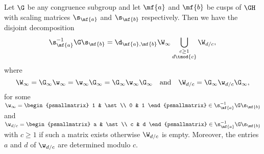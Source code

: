       \begin{theorem}
        Let $\G$ be any congruence subgroup and let $\mf{a}$ and $\mf{b}$ be cusps of $\GH$ with scaling matrices $\s_{\mf{a}}$ and $\s_{\mf{b}}$ respectively. Then we have the disjoint decomposition
        \[
          \s_{\mf{a}}^{-1}\G\s_{\mf{b}} = \d_{\mf{a},\mf{b}}\W_{\infty}\bigcup_{\substack{c \ge 1 \\ d \tmod{c}}}\W_{d/c},
        \]
        where
        \[
          \W_{\infty} = \G_{\infty}\w_{\infty} = \w_{\infty}\G_{\infty} = \G_{\infty}\w_{\infty}\G_{\infty} \quad \text{and} \quad \W_{d/c} = \G_{\infty}\w_{d/c}\G_{\infty},
        \]
        for some $\w_{\infty} = \begin{psmallmatrix} 1 & \ast \\ 0 & 1 \end{psmallmatrix} \in \s_{\mf{a}}^{-1}\G\s_{\mf{b}}$ and $\w_{d/c} = \begin{psmallmatrix} a & \ast \\ c & d \end{psmallmatrix} \in \s_{\mf{a}}^{-1}\G\s_{\mf{b}}$ with $c \ge 1$ if such a matrix exists otherwise $\W_{d/c}$ is empty. Moreover, the entries $a$ and $d$ of $\w_{d/c}$ are determined modulo $c$.
      \end{theorem}
